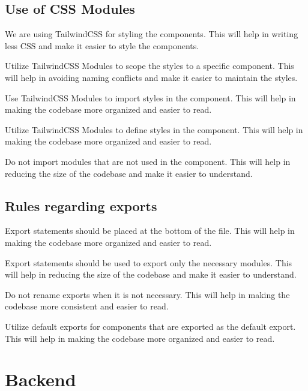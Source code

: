 \documentclass{article}
\begin{document}
\subsection{Use of CSS Modules}
\begin{itemsize}
    \item We are using TailwindCSS for styling the components. This will help in writing less CSS and make it easier to style the components.
    \item Utilize TailwindCSS Modules to scope the styles to a specific component. This will help in avoiding naming conflicts and make it easier to maintain the styles.
    \item Use TailwindCSS Modules to import styles in the component. This will help in making the codebase more organized and easier to read.
    \item Utilize TailwindCSS Modules to define styles in the component. This will help in making the codebase more organized and easier to read.
    \item Do not import modules that are not used in the component. This will help in reducing the size of the codebase and make it easier to understand.
\end{itemsize}

\subsection{Rules regarding exports}
\begin{itemsize}
\item Export statements should be placed at the bottom of the file. This will help in making the codebase more organized and easier to read.
\item Export statements should be used to export only the necessary modules. This will help in reducing the size of the codebase and make it easier to understand.
\item Do not rename exports when it is not necessary. This will help in making the codebase more consistent and easier to read.
\item Utilize default exports for components that are exported as the default export. This will help in making the codebase more organized and easier to read.
\end{itemsize}
\section{Backend}
\end{document}
